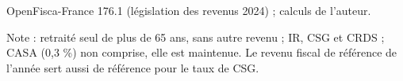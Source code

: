 OpenFisca-France 176.1 (législation des revenus 2024) ; calculs de l'auteur.\par Note : retraité seul de plus de 65 ans, sans autre revenu ; IR, CSG et CRDS ; CASA (0,3 \%) non comprise, elle est maintenue. Le revenu fiscal de référence de l'année sert aussi de référence pour le taux de CSG.
